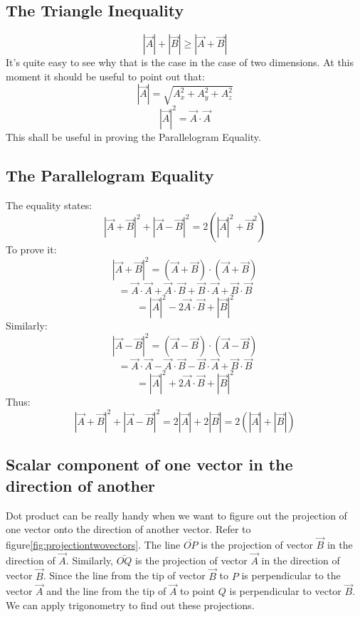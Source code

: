         \subsection{The Triangle Inequality}
            $$|\vec{A}| + |\vec{B}| \geq |\vec{A} + \vec{B}| $$
            It's quite easy to see why that is the case in the case of two dimensions.
            At this moment it should be useful to point out that:
            $$|\vec{A}| = \sqrt{A_x^2 + A_y^2 + A_z^2}$$
            $$|\vec{A}|^2 = \vec{A} \cdot \vec{A}$$
            This shall be useful in proving the Parallelogram Equality.
        
        \subsection{The Parallelogram Equality}
            The equality states:
            $$|\vec{A} + \vec{B}|^2 + |\vec{A} - \vec{B}|^2 = 2\left(|\vec{A}|^2+\vec{B}^2\right)$$
            To prove it:
            $$|\vec{A} + \vec{B}|^2 = \left(\vec{A}+\vec{B}\right)\cdot \left(\vec{A}+\vec{B}\right)$$
            $$= \vec{A}\cdot \vec{A} + \vec{A}\cdot \vec{B} + \vec{B}\cdot \vec{A} + \vec{B}\cdot \vec{B}$$
            $$= |\vec{A}|^2 -2\vec{A}\cdot \vec{B} + |\vec{B}|^2$$
            Similarly:
            $$|\vec{A} - \vec{B}|^2 = \left(\vec{A}-\vec{B}\right)\cdot \left(\vec{A}-\vec{B}\right)$$
            $$= \vec{A}\cdot \vec{A} - \vec{A}\cdot \vec{B} - \vec{B}\cdot \vec{A} + \vec{B}\cdot \vec{B}$$
            $$= |\vec{A}|^2 +2\vec{A}\cdot \vec{B} + |\vec{B}|^2$$
            Thus:
            $$|\vec{A} + \vec{B}|^2 + |\vec{A} - \vec{B}|^2 = 2|\vec{A}| + 2|\vec{B}| = 2\left(|\vec{A}| + |\vec{B}|\right)$$
        
        \subsection{Scalar component of one vector in the direction of another}
            
            Dot product can be really handy when we want to figure out the projection of one vector onto the direction of another vector. Refer to figure\ref{fig:projectiontwovectors}. The line $\bar{OP}$ is the projection of vector $\vec{B}$ in the direction of $\vec{A}$. Similarly, $\bar{OQ}$ is the projection of vector $\vec{A}$ in the direction of vector $\vec{B}$. Since the line from the tip of vector $\vec{B}$ to $P$ is perpendicular to the vector $\vec{A}$ and the line from the tip of $\vec{A}$ to point $Q$ is perpendicular to vector $\vec{B}$. We can apply trigonometry to find out these projections. 

